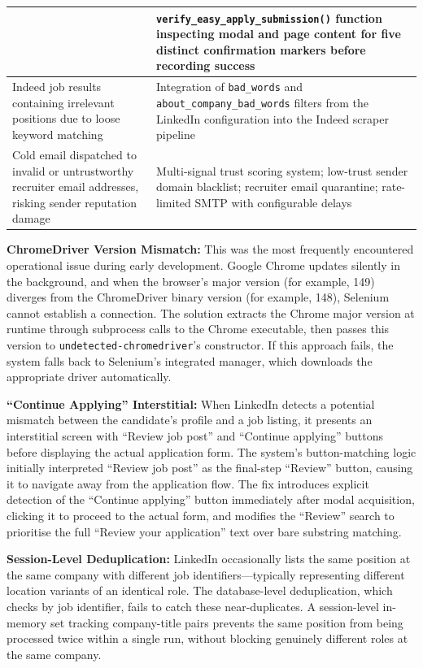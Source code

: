 \documentclass[12pt, a4paper, oneside]{report}
\begin{document}
\begin{table}[H]
\begin{tabularx}{\textwidth}{|X|X|}
& \texttt{verify\_easy\_apply\_submission()} function inspecting modal and page content for five distinct confirmation markers before recording success \\
\hline
Indeed job results containing irrelevant positions due to loose keyword matching
& Integration of \texttt{bad\_words} and \texttt{about\_company\_bad\_words} filters from the LinkedIn configuration into the Indeed scraper pipeline \\
\hline
Cold email dispatched to invalid or untrustworthy recruiter email addresses, risking sender reputation damage
& Multi-signal trust scoring system; low-trust sender domain blacklist; recruiter email quarantine; rate-limited SMTP with configurable delays \\
\hline
\end{tabularx}
\end{table}

\textbf{ChromeDriver Version Mismatch:} This was the most frequently encountered operational issue during early development. Google Chrome updates silently in the background, and when the browser's major version (for example, 149) diverges from the ChromeDriver binary version (for example, 148), Selenium cannot establish a connection. The solution extracts the Chrome major version at runtime through subprocess calls to the Chrome executable, then passes this version to \texttt{undetected-chromedriver}'s constructor. If this approach fails, the system falls back to Selenium's integrated manager, which downloads the appropriate driver automatically.

\textbf{``Continue Applying'' Interstitial:} When LinkedIn detects a potential mismatch between the candidate's profile and a job listing, it presents an interstitial screen with ``Review job post'' and ``Continue applying'' buttons before displaying the actual application form. The system's button-matching logic initially interpreted ``Review job post'' as the final-step ``Review'' button, causing it to navigate away from the application flow. The fix introduces explicit detection of the ``Continue applying'' button immediately after modal acquisition, clicking it to proceed to the actual form, and modifies the ``Review'' search to prioritise the full ``Review your application'' text over bare substring matching.

\textbf{Session-Level Deduplication:} LinkedIn occasionally lists the same position at the same company with different job identifiers---typically representing different location variants of an identical role. The database-level deduplication, which checks by job identifier, fails to catch these near-duplicates. A session-level in-memory set tracking company-title pairs prevents the same position from being processed twice within a single run, without blocking genuinely different roles at the same company.
\end{document}
